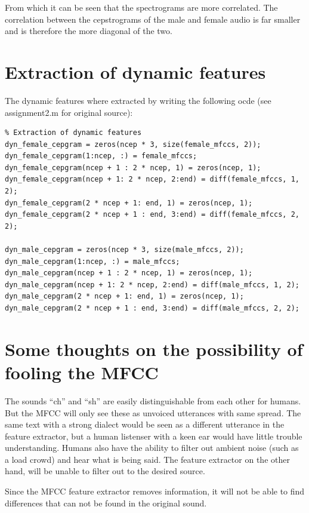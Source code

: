 \documentclass[]{article}
\begin{document}
From which it can be seen that the spectrograms are more correlated. The
correlation between the cepstrograms of the male and female audio is far
smaller and is therefore the more diagonal of the two.

\newpage

\section{Extraction of dynamic
features}\label{extraction-of-dynamic-features}

The dynamic features where extracted by writing the following ocde (see
assignment2.m for original source):

\begin{verbatim}
% Extraction of dynamic features
dyn_female_cepgram = zeros(ncep * 3, size(female_mfccs, 2));
dyn_female_cepgram(1:ncep, :) = female_mfccs;
dyn_female_cepgram(ncep + 1 : 2 * ncep, 1) = zeros(ncep, 1);
dyn_female_cepgram(ncep + 1: 2 * ncep, 2:end) = diff(female_mfccs, 1, 2);
dyn_female_cepgram(2 * ncep + 1: end, 1) = zeros(ncep, 1);
dyn_female_cepgram(2 * ncep + 1 : end, 3:end) = diff(female_mfccs, 2, 2);

dyn_male_cepgram = zeros(ncep * 3, size(male_mfccs, 2));
dyn_male_cepgram(1:ncep, :) = male_mfccs;
dyn_male_cepgram(ncep + 1 : 2 * ncep, 1) = zeros(ncep, 1);
dyn_male_cepgram(ncep + 1: 2 * ncep, 2:end) = diff(male_mfccs, 1, 2);
dyn_male_cepgram(2 * ncep + 1: end, 1) = zeros(ncep, 1);
dyn_male_cepgram(2 * ncep + 1 : end, 3:end) = diff(male_mfccs, 2, 2);
\end{verbatim}

\newpage

\section{Some thoughts on the possibility of fooling the
MFCC}\label{some-thoughts-on-the-possibility-of-fooling-the-mfcc}

The sounds ``ch'' and ``sh'' are easily distinguishable from each other
for humans. But the MFCC will only see these as unvoiced utterances with
same spread. The same text with a strong dialect would be seen as a
different utterance in the feature extractor, but a human listenser with
a keen ear would have little trouble understanding. Humans also have the
ability to filter out ambient noise (such as a load crowd) and hear what
is being said. The feature extractor on the other hand, will be unable
to filter out to the desired source.

Since the MFCC feature extractor removes information, it will not be
able to find differences that can not be found in the original sound.
\end{document}
